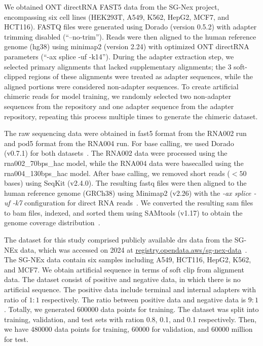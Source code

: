 \documentclass[pdflatex, sn-mathphys-num, lineno]{sn-jnl}%
\theoremstyle{thmstyleone}%
\theoremstyle{thmstyletwo}%
\theoremstyle{thmstylethree}%
\begin{document}
We obtained ONT directRNA FAST5 data from the SG-Nex project, encompassing six cell lines (HEK293T, A549, K562, HepG2, MCF7, and HCT116).
FASTQ files were generated using Dorado (version 0.5.2) with adapter trimming disabled (``--no-trim'').
Reads were then aligned to the human reference genome (hg38) using minimap2 (version 2.24) with optimized ONT directRNA parameters (``-ax splice -uf -k14'').
During the adapter extraction step, we selected primary alignments that lacked supplementary alignments; the 3 soft-clipped regions of these alignments were treated as adapter sequences, while the aligned portions were considered non-adapter sequences.
To create artificial chimeric reads for model training, we randomly selected two non-adapter sequences from the repository and one adapter sequence from the adapter repository, repeating this process multiple times to generate the chimeric dataset.



The raw sequencing data were obtained in fast5 format from the RNA002 run and pod5 format from the RNA004 run.
For base calling, we used Dorado (v0.7.1) for both datasets~\cite{dorado2023}.
The RNA002 data were processed using the rna002\_70bps\_hac model, while the RNA004 data were basecalled using the rna004\_130bps\_hac model.
After base calling, we removed short reads (\( < 50 \) bases) using SeqKit (v2.4.0).
The resulting fastq files were then aligned to the human reference genome (GRCh38) using Minimap2 (v2.26) with the \textit{-ax splice -uf -k7} configuration for direct RNA reads~\cite{li2018minimap2}.
We converted the resulting sam files to bam files, indexed, and sorted them using SAMtools (v1.17) to obtain the genome coverage distribution~\cite{li2009sequence}.

The dataset for this study comprised publicly available \gls{drs} data from the SG-NEx data, which was accessed on 2024 at \url{registry.opendata.aws/sg-nex-data}~\cite{chen2021systematic}.
The SG-NEx data contain six samples including A549, HCT116, HepG2, K562, and MCF7.
We obtain artificial sequence in terms of soft clip from alignment data.
The dataset consist of positive and negative data, in which there is no artificial sequence.
The positive data include terminal and  internal adapters with ratio of \( 1:1 \) respectively.
The ratio between positive data  and negative data is \( 9:1 \).
Totally, we generated \num{600000} data points for training.
The dataset was split into training, validation, and test sets with ration \num{0.8}, \num{0.1}, and \num{0.1} respectively.
Then, we have \num{480000} data points for training, \num{60000} for validation, and \num{60000} million for test.
\end{document}

